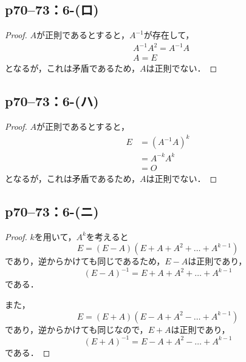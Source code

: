 \documentclass[a4paper,10pt,fleqn]{ltjsarticle}
\begin{document}
\subsection*{p70--73：6-(ロ)}


\begin{tleftbar}
    \begin{proof}
        $A$が正則であるとすると，$A^{-1}$が存在して，
        \begin{align*}
             & A^{-1} A^{2} = A^{-1} A \\
             & A = E
        \end{align*}
        となるが，これは矛盾であるため，$A$は正則でない．
    \end{proof}
\end{tleftbar}

\subsection*{p70--73：6-(ハ)}

\begin{tleftbar}
    \begin{proof}
        $A$が正則であるとすると，
        \begin{align*}
            E & = (A^{-1} A)^{k} \\
              & = A^{-k} A^{k}   \\
              & = O
        \end{align*}
        となるが，これは矛盾であるため，$A$は正則でない．
    \end{proof}
\end{tleftbar}

\subsection*{p70--73：6-(ニ)}

\begin{tleftbar}
    \begin{proof}
        $k$を用いて，$A^k$を考えると
        \[
            E = (E-A)(E+A+A^2+\dots+A^{k-1})
        \]
        であり，逆からかけても同じであるため，$E-A$は正則であり，
        \[
            (E-A)^{-1}=E+A+A^2+\dots+A^{k-1}
        \]
        である．

        また，
        \[
            E=(E+A)(E-A+A^2-\dots+A^{k-1})
        \]
        であり，逆からかけても同じなので，$E+A$は正則であり，
        \[
            (E+A)^{-1} = E-A+A^2-\dots+A^{k-1}
        \]
        である．
    \end{proof}
\end{tleftbar}
\end{document}
